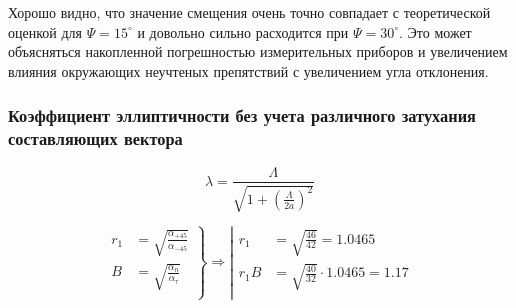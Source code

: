 \documentclass[11pt,a4paper,oneside, reqno]{amsproc}
\begin{document}
Хорошо видно, что значение смещения очень точно совпадает с теоретической оценкой для $\Psi=15^\circ$ 
и довольно сильно расходится при $\Psi=30^\circ$. Это может объясняться накопленной погрешностью измерительных
приборов и увеличением влияния окружающих неучтеных препятствий с увеличением угла отклонения.
\vspace{10 pt}
\subsubsection{Коэффициент эллиптичности без учета различного затухания составляющих вектора}

\begin{equation}
\lambda = \frac{\Lambda}{\sqrt{1 +
            \left( \frac{\Lambda}{2a} \right)^2}}
\end{equation}

$$
\left.
\begin{aligned}
    r_1 &= \sqrt{\frac{\alpha_{+45}}{\alpha_{-45}}}\\
    B &= \sqrt{\frac{\alpha_n}{\alpha_\tau}}\\
\end{aligned}
\right\}
\Longrightarrow
\left|
\begin{aligned}
    r_1 &= \sqrt{\frac{46}{42}} = 1.0465\\
    r_1B &= \sqrt{\frac{40}{32}}\cdot 1.0465 = 1.17\\
\end{aligned}
\right.
$$

\newpage
\end{document}
